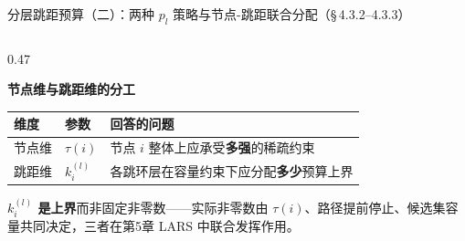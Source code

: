 \documentclass[aspectratio=169,9pt,xcolor=dvipsnames]{beamer}
\newcommand{\highlight}[1]{\textcolor{myred}{\textbf{#1}}}
\newcommand{\blue}[1]{\textcolor{mynavy}{#1}}
\begin{document}
\begin{frame}{分层跳距预算（二）：两种 $p_l$ 策略与节点-跳距联合分配（§\,4.3.2--4.3.3）}
\begin{columns}[T]
\begin{column}{0.47\textwidth}
    \vspace{0.2cm}

  \textbf{\blue{节点维与跳距维的分工}}

  \vspace{0.05cm}
  {
  \small
  \begin{tabular}{m{1cm}m{1cm}m{4cm}}
    \toprule
    维度 & 参数 & 回答的问题 \\
    \midrule
    节点维 & $\tau(i)$ & 节点 $i$ 整体上应承受\textbf{多强}的稀疏约束 \\[3pt]
    跳距维 & $k_i^{(l)}$ & 各跳环层在容量约束下应分配\textbf{多少}预算上界 \\
    \bottomrule
  \end{tabular}
  }
  \vspace{0.2cm}

  \highlight{$k_i^{(l)}$ 是\textbf{上界}}而非固定非零数——实际非零数由 $\tau(i)$、路径提前停止、候选集容量共同决定，三者在第5章 LARS 中联合发挥作用。

\end{column}
\end{columns}
\end{frame}
\end{document}
